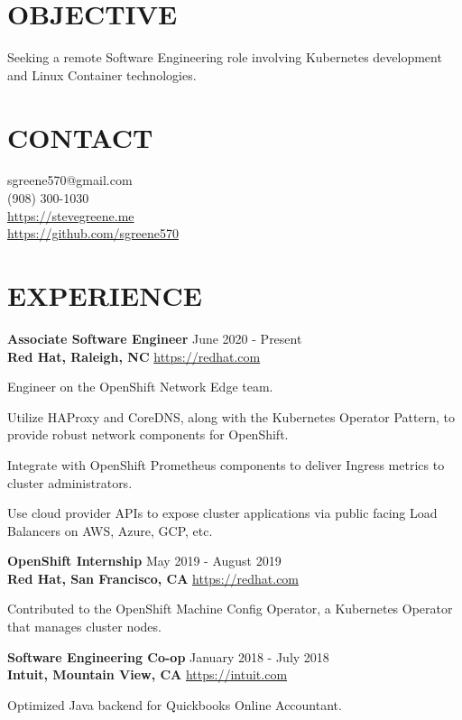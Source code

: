 \documentclass[line, margin, 11pt]{res}
\begin{document}

\begin{resume}

\section{\small OBJECTIVE}
Seeking a remote Software Engineering role involving Kubernetes development and Linux Container technologies.

\section{\small CONTACT}
sgreene570@gmail.com \\
(908) 300-1030 \\
\url{https://stevegreene.me} \\
\url{https://github.com/sgreene570}

\section{\small EXPERIENCE}
{\bf \large{Associate Software Engineer}} \hfill June 2020 - Present \\
{\bf Red Hat, Raleigh, NC} \hfill \url{https://redhat.com}
\begin{compactitem}
    \item Engineer on the OpenShift Network Edge team.
    \item Utilize HAProxy and CoreDNS, along with the Kubernetes Operator Pattern, to provide robust network components for OpenShift.
    \item Integrate with OpenShift Prometheus components to deliver Ingress metrics to cluster administrators.
    \item Use cloud provider APIs to expose cluster applications via public facing Load Balancers on AWS, Azure, GCP, etc.
\end{compactitem}


{\bf \large{OpenShift Internship}} \hfill May 2019 - August 2019 \\
{\bf Red Hat, San Francisco, CA} \hfill \url{https://redhat.com}
\begin{compactitem}
    \item Contributed to the OpenShift Machine Config Operator, a Kubernetes Operator that manages cluster nodes.
\end{compactitem}


{\bf \large{Software Engineering Co-op}} \hfill January 2018 - July 2018 \\
{\bf Intuit, Mountain View, CA} \hfill \url{https://intuit.com}
\begin{compactitem}
    \item Optimized Java backend for Quickbooks Online Accountant.
\end{compactitem}



\end{resume}
\end{document}
